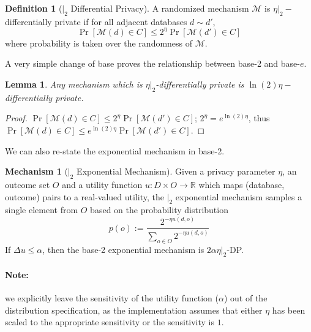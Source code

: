 \documentclass[11pt]{article}
\newtheorem{lemma}[theorem]{Lemma}
\theoremstyle{definition}
\newtheorem{definition}[theorem]{Definition}
\newtheorem{mech}{Mechanism}
\newcommand{\M}{\mathcal{M}}
\begin{document}
\begin{definition}[$|_2$ Differential Privacy]\label{def:b2DP}
A randomized mechanism $\M$ is $\eta|_2-$differentially private if for all adjacent databases $d\sim d'$,
\[\Pr[\M(d) \in C] \leq 2^{\eta} \Pr[\M(d') \in C]\]
where probability is taken over the randomness of $\M$.
\end{definition}

\noindent A very simple change of base proves the relationship between base-2 and base-$e$.
\begin{lemma}\label{lemma:DPtob2DP}
Any mechanism which is $\eta|_2$-differentially private is $\ln(2)\eta-$differentially private. 
\end{lemma}
\begin{proof}
$\Pr[\M(d) \in C] \leq 2^{\eta} \Pr[\M(d') \in C]$;
$2^\eta = e^{\ln(2)\eta}$, thus
$\Pr[\M(d) \in C] \leq e^{\ln(2)\eta} \Pr[\M(d') \in C]$.
\end{proof}
\noindent We can also re-state the exponential mechanism in base-2.
\begin{mech}[$|_2$ Exponential Mechanism] 
Given a privacy parameter $\eta$, an outcome set $O$ and a utility function $u: D \times O \rightarrow \mathbb{R}$ which maps (database, outcome) pairs to a real-valued utility, the $|_2$ exponential mechanism samples a single element from $O$ based on the probability distribution
\begin{equation} p(o) := \frac{2^{-\eta u(d, o)}}{\sum_{o \in O} 2^{-\eta u(d,o)}} \label{eq:b2dist}
\end{equation}
If $\Delta u \leq \alpha$, then the base-2 exponential mechanism is $2\alpha\eta|_2$-DP.  
\end{mech}

\paragraph{Note:} we explicitly leave the sensitivity of the utility function ($\alpha$) out of the distribution specification, as the implementation assumes that either $\eta$ has been scaled to the appropriate sensitivity or the sensitivity is $1$. 

\end{document}
